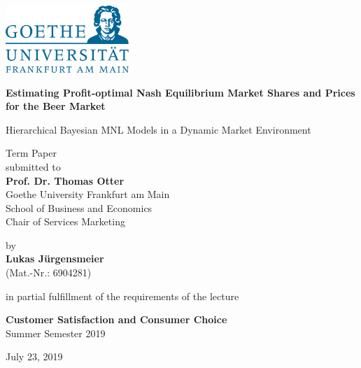\documentclass[12pt,a4paper]{article}
\begin{document}
\begin{center}
 \includegraphics[width=0.35\textwidth]{GU-Logo-blau-CMYK.eps} \vspace{2cm}
  
  {\Large{\bf Estimating Profit-optimal Nash Equilibrium Market Shares and Prices for the Beer Market}} \medskip

  {\Large{Hierarchical Bayesian MNL Models in a Dynamic Market Environment}} \vspace{0.5cm}

  Term Paper \\\vspace{2cm}
  submitted to \\\vspace{0.5cm}
  \textbf{Prof. Dr. Thomas Otter} \\\vspace{0.5cm}
  Goethe University Frankfurt am Main \\
  School of Business and Economics \\
  Chair of Services Marketing \vspace{2cm}
  
  by \\\vspace{0.5cm}
  \textbf{Lukas J\"urgensmeier} \\
  (Mat.-Nr.: 6904281) \\
  
  \bigskip

  in partial fulfillment of the requirements of the lecture \medskip

 {\bf Customer Satisfaction and Consumer Choice} \\
  Summer Semester 2019\\
  \medskip

  July 23, 2019
  
\end{center}


\pagebreak
\pagestyle{plain}
\tableofcontents
\pagebreak
\listoffigures
\pagebreak
\listoftables
\newpage
\setcounter{page}{2}
\setlength{\baselineskip}{1.5\baselineskip}
\pagestyle{plain}
\end{document}

